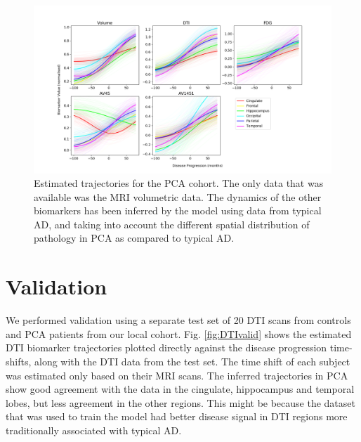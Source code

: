 \documentclass{llncs}
\begin{document}
\begin{figure}[H]
 \includegraphics[width=\textwidth, trim=0 0 0 0, clip]{figures/trajDisSpaceOverlap_PCA_tad-drcTinyPen1_JMD.png}
 \caption{Estimated trajectories for the PCA cohort. The only data that was available was the MRI volumetric data. The dynamics of the other biomarkers has been inferred by the model using data from typical AD, and taking into account the different spatial distribution of pathology in PCA as compared to typical AD.}
 \label{fig:PCAtrajByModality}
\end{figure}
% 
% 


\section*{Validation}

We performed validation using a separate test set of 20 DTI scans from controls and PCA patients from our local cohort. Fig. \ref{fig:DTIvalid} shows the estimated DTI biomarker trajectories plotted directly against the disease progression time-shifts, along with the DTI data from the test set. The time shift of each subject was estimated only based on their MRI scans. The inferred trajectories in PCA show good agreement with the data in the cingulate, hippocampus and temporal lobes, but less agreement in the other regions. This might be because the dataset that was used to train the model had better disease signal in DTI regions more traditionally associated with typical AD.
\end{document}
